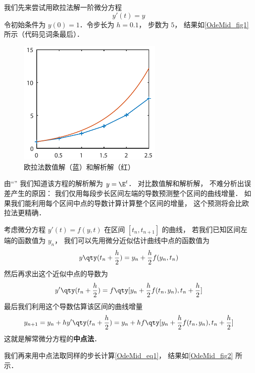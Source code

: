 

我们先来尝试用欧拉法解一阶微分方程
\begin{equation}\label{OdeMid_eq1}
y'(t) = y
\end{equation}
令初始条件为 $y(0) = 1$．令步长为 $h = 0.1$， 步数为 $5$， 结果如\autoref{OdeMid_fig1} 所示（代码见词条最后）．

\begin{figure}[ht]
\centering
\includegraphics[width=7cm]{./figures/OdeMid.pdf}
\caption{欧拉法数值解（蓝）和解析解（红）} \label{OdeMid_fig1}
\end{figure}

由“”%
我们知道该方程的解析解为 $y = \E^{t}$． 对比数值解和解析解， 不难分析出误差产生的原因： 我们仅用每段步长区间左端的导数预测整个区间的曲线增量． 如果我们能利用每个区间中点的导数计算计算整个区间的增量， 这个预测将会比欧拉法更精确．

考虑微分方程 $y'(t) = f(y, t)$ 在区间 $[t_n, t_{n+1}]$ 的曲线， 若我们已知区间左端的函数值为 $y_n$， 我们可以先用微分近似估计曲线中点的函数值为
\begin{equation}
y \qty(t_n + \frac h2) = y_n + \frac h2 f(y_n, t_n)
\end{equation}
然后再求出这个近似中点的导数为
\begin{equation}
y' \qty(t_n + \frac h2) = f \qty[y_n + \frac h2 f(t_n, y_n), t_n + \frac h2]
\end{equation}
最后我们利用这个导数估算该区间的曲线增量
\begin{equation}
y_{n+1} = y_n + hy' \qty(t_n + \frac h2) = y_n + h f \qty[y_n + \frac h2 f(t_n, y_n), t_n + \frac h2]
\end{equation}
这就是解常微分方程的\textbf{中点法}．

我们再来用中点法取同样的步长计算\autoref{OdeMid_eq1}， 结果如\autoref{OdeMid_fig2} 所示．

